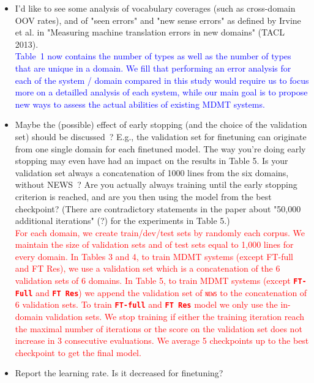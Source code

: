 \documentclass[12pt,times,a4paper,twoside]{article}
\newcommand{\fyTodo}[1]{\Todo[FY:]{\textcolor{orange}{#1}}}
\theoremstyle{definition}
\newcommand{\domain}[1]{\texttt{\textsc{#1}}}
\newcommand{\system}[1]{\texttt{\textbf{#1}}}
\begin{document}
\begin{itemize}
\item I'd like to see some analysis of vocabulary coverages (such as
cross-domain OOV rates), and of "seen errors" and "new sense errors" as defined by Irvine et al. in "Measuring machine translation errors in new domains" (TACL 2013).
\\
\textcolor{blue}{Table~1 now contains the number of types as well as the number of types that are unique in a domain. We fill that performing an error analysis for each of the system / domain compared in this study would require us to focus more on a detailled analysis of each system, while our main goal is to propose new ways to assess the actual abilities of existing MDMT systems.}\fyTodo{Will this be enough ?}
\\
\item Maybe the (possible) effect of early stopping (and the choice of the validation set) should be discussed~? E.g., the validation set for finetuning can originate from one single domain for each finetuned model. The way you're doing early stopping may even have had an impact on the results in Table 5. Is your validation set always a concatenation of 1000 lines from the six domains, without NEWS~? Are you actually always training until the early stopping criterion is reached, and are you then using the model from the best checkpoint? (There are contradictory statements in the paper about "50,000  additional iterations" (?) for the experiments in Table 5.)
\\
\textcolor{red}{For each domain, we create train/dev/test sets by randomly each corpus. We maintain the size of validation sets and of test sets equal to 1,000 lines for every domain. In Tables 3 and 4, to train MDMT systems (except FT-full and FT Res), we use a validation set which is a concatenation of the 6 validation sets of 6 domains. In Table 5, to train MDMT systems (except \system{FT-Full} and \system{FT Res}) we append the validation set of \domain{news} to the concatenation of 6 validation sets. To train \system{FT-full} and \system{FT Res} model we only use the in-domain validation sets. We stop training if either the training iteration reach the maximal number of iterations or the score on the validation set does not increase in 3 consecutive evaluations. We average 5 checkpoints up to the best checkpoint to get the final model.}\fyTodo{up to the best ?}
\\
\item Report the learning rate. Is it decreased for finetuning?

\end{itemize}
\end{document}
